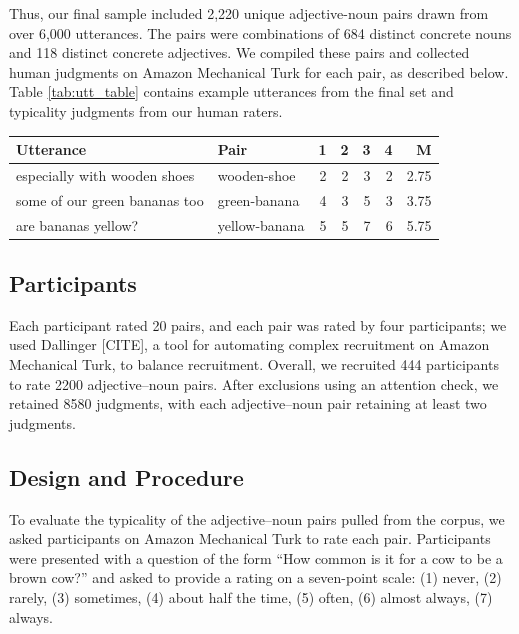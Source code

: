 \documentclass[10pt, letterpaper]{article}
\begin{document}
Thus, our final sample included 2,220 unique adjective-noun pairs drawn
from over 6,000 utterances. The pairs were combinations of 684 distinct
concrete nouns and 118 distinct concrete adjectives. We compiled these
pairs and collected human judgments on Amazon Mechanical Turk for each
pair, as described below. Table \ref{tab:utt_table} contains example
utterances from the final set and typicality judgments from our human
raters.

\begin{table}[tb]
\centering
\begingroup\fontsize{9pt}{9pt}\selectfont
\begin{tabular}{llrrrrr}
  \hline
Utterance & Pair & 1 & 2 & 3 & 4 & M \\ 
  \hline
especially with wooden shoes & wooden-shoe &   2 &   2 &   3 &   2 & 2.75 \\ 
  some of our green bananas too & green-banana &   4 &   3 &   5 &   3 & 3.75 \\ 
  are bananas yellow? & yellow-banana &   5 &   5 &   7 &   6 & 5.75 \\ 
   \hline
\end{tabular}
\endgroup
\end{table}

\hypertarget{participants}{%
\subsection{Participants}\label{participants}}

Each participant rated 20 pairs, and each pair was rated by four
participants; we used Dallinger {[}CITE{]}, a tool for automating
complex recruitment on Amazon Mechanical Turk, to balance recruitment.
Overall, we recruited 444 participants to rate 2200 adjective--noun
pairs. After exclusions using an attention check, we retained 8580
judgments, with each adjective--noun pair retaining at least two
judgments.

\hypertarget{design-and-procedure}{%
\subsection{Design and Procedure}\label{design-and-procedure}}

To evaluate the typicality of the adjective--noun pairs pulled from the
corpus, we asked participants on Amazon Mechanical Turk to rate each
pair. Participants were presented with a question of the form ``How
common is it for a cow to be a brown cow?'' and asked to provide a
rating on a seven-point scale: (1) never, (2) rarely, (3) sometimes, (4)
about half the time, (5) often, (6) almost always, (7) always.
\end{document}
